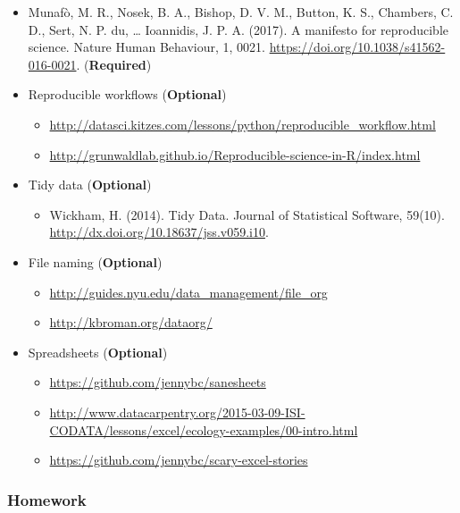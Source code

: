 \documentclass[
]{article}
\providecommand{\tightlist}{%
  \setlength{\itemsep}{0pt}\setlength{\parskip}{0pt}}
\begin{document}
\begin{itemize}
\tightlist
\item
  Munafò, M. R., Nosek, B. A., Bishop, D. V. M., Button, K. S.,
  Chambers, C. D., Sert, N. P. du, \ldots{} Ioannidis, J. P. A. (2017).
  A manifesto for reproducible science. Nature Human Behaviour, 1, 0021.
  \url{https://doi.org/10.1038/s41562-016-0021}. (\textbf{Required})
\item
  Reproducible workflows (\textbf{Optional})

  \begin{itemize}
  \tightlist
  \item
    \url{http://datasci.kitzes.com/lessons/python/reproducible_workflow.html}
  \item
    \url{http://grunwaldlab.github.io/Reproducible-science-in-R/index.html}
  \end{itemize}
\item
  Tidy data (\textbf{Optional})

  \begin{itemize}
  \tightlist
  \item
    Wickham, H. (2014). Tidy Data. Journal of Statistical Software,
    59(10). \url{http://dx.doi.org/10.18637/jss.v059.i10}.
  \end{itemize}
\item
  File naming (\textbf{Optional})

  \begin{itemize}
  \tightlist
  \item
    \url{http://guides.nyu.edu/data_management/file_org}
  \item
    \url{http://kbroman.org/dataorg/}
  \end{itemize}
\item
  Spreadsheets (\textbf{Optional})

  \begin{itemize}
  \tightlist
  \item
    \url{https://github.com/jennybc/sanesheets}
  \item
    \url{http://www.datacarpentry.org/2015-03-09-ISI-CODATA/lessons/excel/ecology-examples/00-intro.html}
  \item
    \url{https://github.com/jennybc/scary-excel-stories}
  \end{itemize}
\end{itemize}

\hypertarget{homework-2}{%
\subsubsection{Homework}\label{homework-2}}
\end{document}
